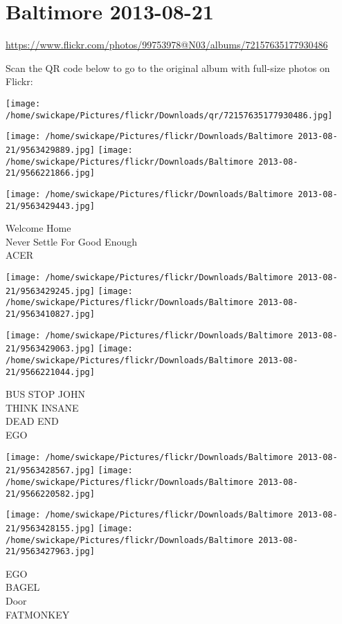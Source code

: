 \documentclass[10pt,letterpaper]{article}
\title{}
\author{}
\date{}
\begin{document}
\section*{Baltimore 2013-08-21}

\url{https://www.flickr.com/photos/99753978@N03/albums/72157635177930486}

Scan the QR code below to go to the original album with full-size photos on Flickr:

\texttt{[image: /home/swickape/Pictures/flickr/Downloads/qr/72157635177930486.jpg]}
\pagebreak

\texttt{[image: /home/swickape/Pictures/flickr/Downloads/Baltimore 2013-08-21/9563429889.jpg]}
\texttt{[image: /home/swickape/Pictures/flickr/Downloads/Baltimore 2013-08-21/9566221866.jpg]}

\vspace{0.25in}
\texttt{[image: /home/swickape/Pictures/flickr/Downloads/Baltimore 2013-08-21/9563429443.jpg]}

Welcome Home\\
Never Settle For Good Enough\\
ACER
\pagebreak

\texttt{[image: /home/swickape/Pictures/flickr/Downloads/Baltimore 2013-08-21/9563429245.jpg]}
\texttt{[image: /home/swickape/Pictures/flickr/Downloads/Baltimore 2013-08-21/9563410827.jpg]}

\texttt{[image: /home/swickape/Pictures/flickr/Downloads/Baltimore 2013-08-21/9563429063.jpg]}
\texttt{[image: /home/swickape/Pictures/flickr/Downloads/Baltimore 2013-08-21/9566221044.jpg]}

BUS STOP JOHN\\
THINK INSANE\\
DEAD END\\
EGO
\pagebreak

\texttt{[image: /home/swickape/Pictures/flickr/Downloads/Baltimore 2013-08-21/9563428567.jpg]}
\texttt{[image: /home/swickape/Pictures/flickr/Downloads/Baltimore 2013-08-21/9566220582.jpg]}

\texttt{[image: /home/swickape/Pictures/flickr/Downloads/Baltimore 2013-08-21/9563428155.jpg]}
\texttt{[image: /home/swickape/Pictures/flickr/Downloads/Baltimore 2013-08-21/9563427963.jpg]}

EGO\\
BAGEL\\
Door\\
FATMONKEY
\pagebreak
\end{document}
